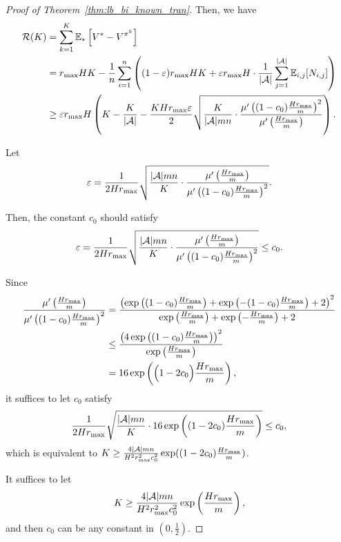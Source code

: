 \begin{proof}[Proof of Theorem~\ref{thm:lb_bi_known_tran}]
	Then, we have
	\begin{align*}
		\mathcal{R}(K) &= \sum_{k=1}^{K} \mathbb{E}_{*}\left[ V^*-V^{\pi^k} \right]
		\\
		&= r_{\max} HK - \frac{1}{n} \sum_{i=1}^{n} \left(  (1-\varepsilon)r_{\max} HK + \varepsilon r_{\max} H \cdot \frac{1}{|\mathcal{A}|} \sum_{j=1}^{|\mathcal{A}|} \mathbb{E}_{i,j}[N_{i,j}]  \right)
		\\
		&\geq \varepsilon r_{\max} H \left( K - \frac{K}{|\mathcal{A}|} - \frac{K Hr_{\max} \varepsilon}{2}  \sqrt{ \frac{K}{|\mathcal{A}| m n} \cdot \frac{ \mu'\left(  (1-c_0) \frac{Hr_{\max}}{m}  \right)^2 }{ \mu'\left(  \frac{Hr_{\max}}{m}  \right) } }   \right) .
	\end{align*}
	
	
	
	Let
	\begin{align*}
		\varepsilon= \frac{1}{2 Hr_{\max}} \sqrt{ \frac{|\mathcal{A}| m n}{K} \cdot \frac{ \mu'\left(  \frac{Hr_{\max}}{m}  \right) }{ \mu'\left(  (1-c_0) \frac{Hr_{\max}}{m}  \right)^2 } } .
	\end{align*}
	
	Then, the constant $c_0$ should satisfy
	\begin{align*}
		\varepsilon= \frac{1}{2 Hr_{\max}} \sqrt{ \frac{|\mathcal{A}| m n}{K} \cdot \frac{ \mu'\left(  \frac{Hr_{\max}}{m}  \right) }{ \mu'\left(  (1-c_0) \frac{Hr_{\max}}{m}  \right)^2 } } \leq c_0 .
	\end{align*}
	
	Since 
	\begin{align*}
		\frac{ \mu'\left(  \frac{Hr_{\max}}{m}  \right) }{ \mu'\left(  (1-c_0) \frac{Hr_{\max}}{m}  \right)^2 } &= \frac{ \left(  \exp\left(  (1-c_0) \frac{Hr_{\max}}{m}  \right) + \exp\left(  - (1-c_0) \frac{Hr_{\max}}{m}  \right) +2  \right)^2 }{ \exp\left(  \frac{Hr_{\max}}{m}  \right) + \exp\left(  - \frac{Hr_{\max}}{m}  \right) + 2 }
		\\
		&\leq \frac{ \left( 4 \exp\left(  (1-c_0) \frac{Hr_{\max}}{m}  \right)  \right)^2 }{ \exp\left(  \frac{Hr_{\max}}{m}  \right) }
		\\
		&= 16 \exp\left(  \Big(1-2c_0\Big) \frac{Hr_{\max}}{m}  \right)   ,
	\end{align*}
	it suffices to let $c_0$ satisfy
	\begin{align*}
		\frac{1}{2 Hr_{\max}} \sqrt{ \frac{|\mathcal{A}| m n}{K} \cdot 16 \exp\left(  (1-2c_0) \frac{Hr_{\max}}{m}  \right) } \leq c_0 ,
	\end{align*}
	which is equivalent to
	$
	K \geq \frac{ 4|\mathcal{A}| m n }{ H^2 r_{\max}^2 c_0^2}  \exp( (1-2c_0) \frac{Hr_{\max}}{m} )
	$.
	
	It suffices to let 
	\begin{align*}
		K \geq \frac{4 |\mathcal{A}| m n }{ H^2 r_{\max}^2 c_0^2}  \exp\left(  \frac{Hr_{\max}}{m}  \right) ,
	\end{align*}
	and then $c_0$ can be any constant in $(0,\frac{1}{2})$.
	

\end{proof}

